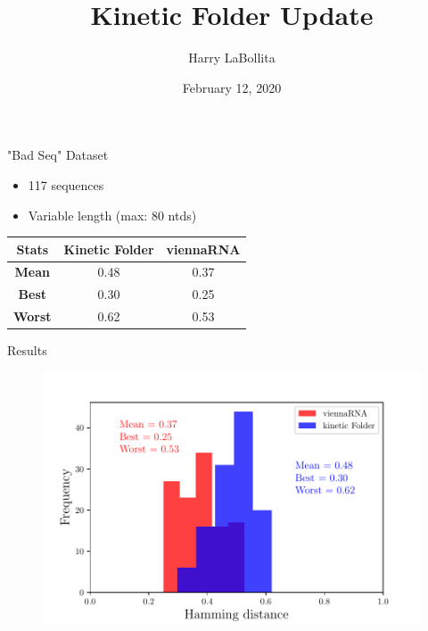 \documentclass{beamer}
\author{Harry LaBollita}
\institute{Arizona State University}
\title{Kinetic Folder Update}
\date{February 12, 2020}
\begin{document}
\frame{\titlepage}

\begin{frame}{"Bad Seq" Dataset}

\begin{itemize}
\item 117 sequences
\item Variable length (max: 80 ntds)
\end{itemize}
\begin{table}
\centering
\begin{tabular}{|ccc|}
\hline
{\bf Stats} & {\bf Kinetic Folder} & {\bf viennaRNA}\\
\hline
\hline
{\bf Mean} & 0.48 & 0.37 \\
{\bf Best} & 0.30 & 0.25 \\
{\bf Worst} & 0.62 & 0.53\\
\hline
\end{tabular}
\end{table}
\end{frame}

\begin{frame}{Results}
\begin{figure}[H]
\centering
\includegraphics[scale =0.625]{bad_seq_plot.pdf}
\end{figure}
\end{frame}
\end{document}
